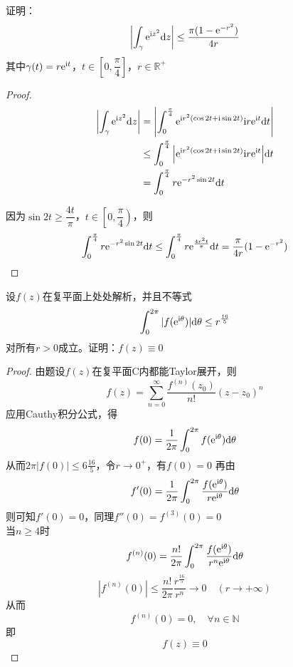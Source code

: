 \begin{proposition}

    证明：
    \[\left| \int_{\gamma}{\mathrm{e}^{\mathrm{i} z^2}}\mathrm{d} z \right| \leq \dfrac{\pi(1 - \mathrm{e}^{-r^2})}{4r}\]
    其中$\gamma(t) = r\mathrm{e}^{\mathrm{i} t}$，$t \in \left[ 0, \dfrac{\pi}{4} \right]$，$r \in \mathbb{R}^+$

\end{proposition}

\begin{proof}

    \begin{align*}
        \left| \int_{\gamma}{\mathrm{e}^{\mathrm{i} z^2}}\mathrm{d} z \right| & = \left| \int_{0}^{\frac{\pi}{4}}{\mathrm{e}^{\mathrm{i} r^2(\cos{2t} + \mathrm{i}\sin{2t})}\mathrm{i} r\mathrm{e}^{\mathrm{i} t}}\mathrm{d} t \right| \\
        & \leq \int_{0}^{\frac{\pi}{4}}{\left| \mathrm{e}^{\mathrm{i} r^2(\cos{2t} + \mathrm{i}\sin{2t})}\mathrm{i} r\mathrm{e}^{\mathrm{i} t} \right|}\mathrm{d} t \\
        & = \int_{0}^{\frac{\pi}{4}}{r\mathrm{e}^{-r^2\sin{2t}}}\mathrm{d} t
    \end{align*}

    因为$\sin{2t} \geq \dfrac{4t}{\pi}$，$t \in \left[ 0, \dfrac{\pi}{4} \right)$，则
    \[\int_{0}^{\frac{\pi}{4}}{r\mathrm{e}^{-r^2\sin{2t}}}\mathrm{d} t \leq \int_{0}^{\frac{\pi}{4}}{r\mathrm{e}^{\frac{4r^2t}{\pi}}}\mathrm{d} t = \dfrac{\pi}{4r}(1 - \mathrm{e}^{-r^2}) \]

\end{proof}

\begin{proposition}

    设$f(z)$在复平面上处处解析，并且不等式
    \[\int_{0}^{2\pi}{|f(\mathrm{e^{\mathrm{i} \theta}})|}\mathrm{d} \theta \leq r^{\frac{16}{5}} \]
    对所有$r > 0$成立。证明：$f(z) \equiv 0$

\end{proposition}

\begin{proof}

    由题设$f(z)$在复平面$\mathrm{C}$内都能\textup{Taylor}展开，则
    \[f(z) = \sum\limits_{n = 0}^{\infty}{\dfrac{f^{(n)}(z_0)}{n!}(z - z_0)^n}\]
    应用\textup{Cauthy}积分公式，得
    \[f(0) = \dfrac{1}{2\pi} \int_{0}^{2\pi}{f(\mathrm{e}^{\mathrm{i} \theta})}\mathrm{d} \theta\]
    从而$2\pi|f(0)| \leq 6{\frac{16}{5}}$，令$r \to 0^{+}$，有$f(0) = 0$
    再由
    \[f'(0) = \dfrac{1}{2\pi} \int_{0}^{2\pi}{\dfrac{f(\mathrm{e}^{\mathrm{i} \theta})}{r\mathrm{e}^{\mathrm{i} \theta}}}\mathrm{d} \theta\]
    则可知$f'(0) = 0$，同理$f''(0) = f^{(3)}(0) = 0$ \\
    当$n \geq 4$时
    \[f^{(n)}(0) =  \dfrac{n!}{2\pi} \int_{0}^{2\pi}{\dfrac{f(\mathrm{e}^{\mathrm{i}\theta})}{r^n \mathrm{e}^{\mathrm{i}\theta}}}\mathrm{d} \theta\]
    \[|f^{(n)}(0)| \leq \dfrac{n!}{2\pi} \dfrac{r^{\frac{16}{5}}}{r^n} \to 0 \quad (r \to + \infty)\]
    从而
    \[f^{(n)}(0) = 0, \quad \forall n \in \mathbb{N}\]
    即
    \[f(z) \equiv 0\]
    
\end{proof}

